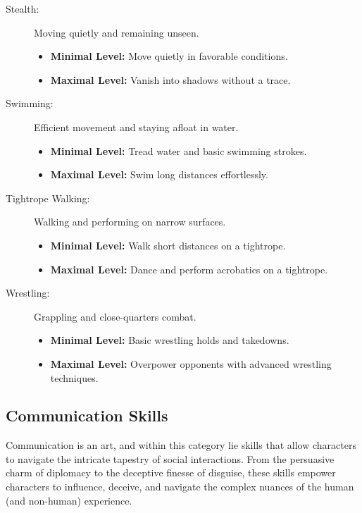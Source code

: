 \documentclass[12pt]{book}
\begin{document}
\begin{description}
    \item[Stealth:] Moving quietly and remaining unseen.
        \begin{itemize}
            \item \textbf{Minimal Level:} Move quietly in favorable conditions.
            \item \textbf{Maximal Level:} Vanish into shadows without a trace.
        \end{itemize}

    \item[Swimming:] Efficient movement and staying afloat in water.
        \begin{itemize}
            \item \textbf{Minimal Level:} Tread water and basic swimming strokes.
            \item \textbf{Maximal Level:} Swim long distances effortlessly.
        \end{itemize}

    \item[Tightrope Walking:] Walking and performing on narrow surfaces.
        \begin{itemize}
            \item \textbf{Minimal Level:} Walk short distances on a tightrope.
            \item \textbf{Maximal Level:} Dance and perform acrobatics on a tightrope.
        \end{itemize}

    \item[Wrestling:] Grappling and close-quarters combat.
        \begin{itemize}
            \item \textbf{Minimal Level:} Basic wrestling holds and takedowns.
            \item \textbf{Maximal Level:} Overpower opponents with advanced wrestling techniques.
        \end{itemize}
\end{description}

\subsection{\textbf{Communication Skills}}

Communication is an art, and within this category lie skills that allow characters to navigate the intricate tapestry of social interactions. From the persuasive charm of diplomacy to the deceptive finesse of disguise, these skills empower characters to influence, deceive, and navigate the complex nuances of the human (and non-human) experience.
\end{document}

